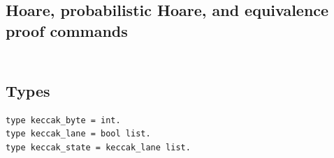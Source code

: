 \subsection*{Hoare, probabilistic Hoare, and equivalence proof commands}
\begin{lstlisting}[language=EasyCrypt,basicstyle=\ttfamily\tiny]
\end{lstlisting}

\section*{}

\subsection*{Types}
\begin{lstlisting}[language=EasyCrypt,basicstyle=\ttfamily\tiny]
type keccak_byte = int.
type keccak_lane = bool list.
type keccak_state = keccak_lane list.
\end{lstlisting}


